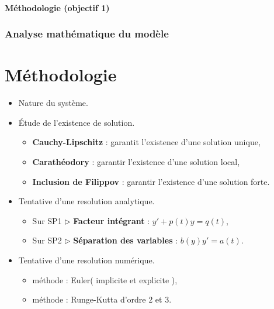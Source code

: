 \documentclass[handout]{beamer}
\newtheorem{pbm et hypo}[thm]{Problématique et hypothèses}
\begin{document}
	\begin{frame}
			\framesubtitle{\textbf{Méthodologie (objectif 1)}}
			\frametitle{\textbf{Analyse mathématique du modèle}}
			\section{Méthodologie}
			\begin{itemize}
				\item[\maltese] Nature du système.  \pause
				\vspace{0.3cm}
				\item[\maltese] Étude de l'existence de solution. 
				\begin{itemize}
					\item \textbf{Cauchy-Lipschitz}  : garantit l'existence d'une solution unique, 
					\item \textbf{Carathéodory} : garantir l'existence d'une solution local, 
					\item  \textbf{Inclusion de Filippov} : garantir l'existence d'une solution forte. %
					\pause
				\end{itemize}
					\vspace{0.2cm}
				\item[\maltese] Tentative d'une resolution analytique. 
				\begin{itemize}
					\item Sur SP1 $\rhd$ \textbf{Facteur intégrant} : $y' + p(t)y = q(t)$,
					\item Sur SP2 $\rhd$ \textbf{Séparation des variables} : $b(y)y' = a(t)$.
				\end{itemize}
				\pause
					\vspace{0.2cm}
				\item[\maltese]Tentative d'une resolution numérique. 
				\begin{itemize}
					\item méthode : Euler( implicite et explicite ), 
					\item méthode : Runge-Kutta d'ordre 2 et 3. 
				\end{itemize}
			\end{itemize}
	\end{frame}
	
\end{document}
